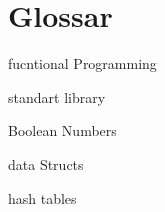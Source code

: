 \section*{Glossar}

fucntional Programming

standart library

Boolean Numbers

data Structs

hash tables

